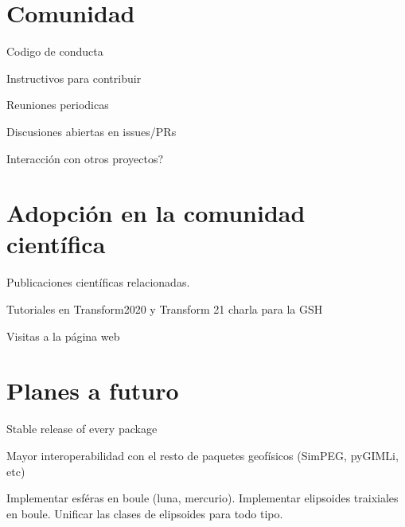 







\section{Comunidad}

Codigo de conducta

Instructivos para contribuir

Reuniones periodicas

Discusiones abiertas en issues/PRs

Interacción con otros proyectos?


\section{Adopción en la comunidad científica}

Publicaciones científicas relacionadas.

Tutoriales en Transform2020 y Transform 21 charla para la GSH

Visitas a la página web


\section{Planes a futuro}

Stable release of every package

Mayor interoperabilidad con el resto de paquetes geofísicos (SimPEG, pyGIMLi, etc)

Implementar esféras en boule (luna, mercurio).
Implementar elipsoides traixiales en boule.
Unificar las clases de elipsoides para todo tipo.
